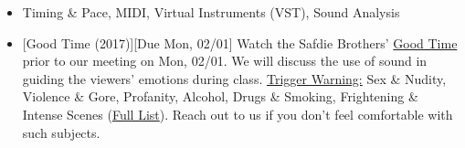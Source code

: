 \def\dMon{Mon, 02/01}
\def\dTues{Tues, 02/02}
\def\dWed{Wed, 02/03}
\def\dThur{Thur, 02/04}
\def\dFri{Fri, 02/05}
\def\dSat{Sat, 02/06}
\def\dSun{Sun, 02/07}
\placeDate


\begin{itemize}[noitemsep,topsep=0pt,leftmargin=*]
	\item {} Timing \& Pace, MIDI, Virtual Instruments (VST), Sound Analysis
	\item {}[Good Time (2017)][Due \dMon] \newline
	      Watch the Safdie Brothers' \href{https://www.netflix.com/watch/80191344?source=35}{Good Time} prior to our meeting on \dMon. We will discuss the use of sound in guiding the viewers' emotions during class.  \newline
	      \ul{Trigger Warning:} Sex \& Nudity, Violence \& Gore, Profanity, Alcohol, Drugs \& Smoking, Frightening \& Intense Scenes (\href{https://www.imdb.com/title/tt4846232/parentalguide}{Full List}). Reach out to us if you don't feel comfortable with such subjects.


\end{itemize}
